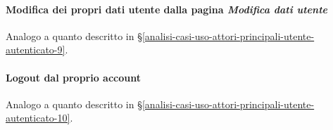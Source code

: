 \paragraph{Modifica dei propri dati utente dalla pagina \textit{Modifica dati utente}}
\label{analisi-casi-uso-attori-principali-utente-amministratore-18}
Analogo a quanto descritto in §\ref{analisi-casi-uso-attori-principali-utente-autenticato-9}.




\paragraph{Logout dal proprio account}
\label{analisi-casi-uso-attori-principali-utente-amministratore-19}
Analogo a quanto descritto in §\ref{analisi-casi-uso-attori-principali-utente-autenticato-10}.